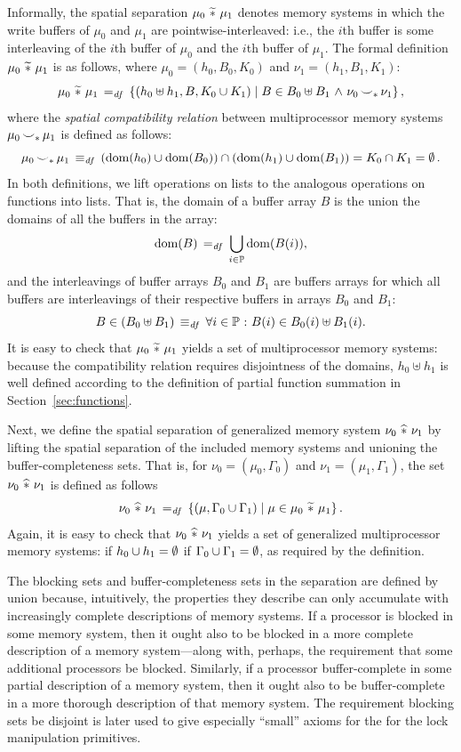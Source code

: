 \documentclass[11pt]{report}
\begin{document}
Informally, the spatial separation $\mu_0 \operatorname{\,\widetilde{\ast}\,} \mu_1$ denotes memory systems in which the write buffers of $\mu_0$ and $\mu_1$ are pointwise-interleaved: i.e., the $i$th buffer is some interleaving of the $i$th buffer of $\mu_0$ and the $i$th buffer of $\mu_1$. The formal definition $\mu_0 \operatorname{\,\widetilde{\ast}\,} \mu_1$ is as follows, where $\mu_0 = (h_0,B_0,K_0)$ and $\nu_1 = (h_1,B_1,K_1)$: \[ \mu_0 \operatorname{\,\widetilde{\ast}\,} \mu_1 \operatorname{\;=_{\mathit{df}}\;} \left\lbrace (h_0 \uplus h_1, B, K_0 \cup K_1) \mid B \in B_0 \uplus B_1 \operatorname{\,\wedge\,} \nu_0 \operatorname{\smile}_\ast \nu_1 \right\rbrace,\] where the \emph{spatial compatibility relation} between multiprocessor memory systems $\mu_0 \operatorname{\smile}_\ast \mu_1$ is defined as follows: \[ \mu_0 \operatorname{\smile}_\ast \mu_1 \operatorname{\;\equiv_{\mathit{df}}\;} \left(\operatorname{\mathrm{dom}}(h_0) \cup \operatorname{\mathrm{dom}}(B_0) \right) \cap \left( \operatorname{\mathrm{dom}}(h_1) \cup \operatorname{\mathrm{dom}}(B_1) \right) = K_0 \cap K_1 = \operatorname{\emptyset}.\] In both definitions, we lift operations on lists to the analogous operations on functions into lists. That is, the domain of a buffer array $B$ is the union the domains of all the buffers in the array:  \[ \operatorname{\mathrm{dom}}(B) \operatorname{\;=_{\mathit{df}}\;} \bigcup_{i \in \mathbb{P}} \operatorname{\mathrm{dom}}(B(i)),\] and the interleavings of buffer arrays $B_0$ and $B_1$ are buffers arrays for which all buffers are interleavings of their respective buffers in arrays $B_0$ and $B_1$: \[ B \in (B_0 \uplus B_1) \operatorname{\;\equiv_{\mathit{df}}\;} \forall i \in \mathbb{P} \operatorname{\,:\,} B(i) \in B_0(i) \uplus B_1(i).\] It is easy to check that $\mu_0 \operatorname{\,\widetilde{\ast}\,} \mu_1$ yields a set of multiprocessor memory systems: because the compatibility relation requires disjointness of the domains, $h_0 \uplus h_1$ is well defined according to the definition of partial function summation in Section~\ref{sec:functions}. 

Next, we define the spatial separation of generalized memory system $\nu_0 \operatorname{\,\widehat{\ast}\,} \nu_1$ by lifting the spatial separation of the included memory systems and unioning the buffer-completeness sets. That is, for $\nu_0 = (\mu_0,\Gamma_0)$ and $\nu_1 = (\mu_1,\Gamma_1)$, the set $\nu_0 \operatorname{\,\widehat{\ast}\,} \nu_1$ is defined as follows \[ \nu_0 \operatorname{\,\widehat{\ast}\,} \nu_1 \operatorname{\;=_{\mathit{df}}\;} \left\lbrace (\mu,\Gamma_0 \cup \Gamma_1) \mid \mu \in \mu_0 \operatorname{\,\widetilde{\ast}\,} \mu_1 \right\rbrace.\] Again, it is easy to check that $\nu_0 \operatorname{\,\widehat{\ast}\,} \nu_1$ yields a set of generalized multiprocessor memory systems: if $h_0 \cup h_1 = \operatorname{\emptyset}$ if $\Gamma_0 \cup \Gamma_1 = \operatorname{\emptyset}$, as required by the definition. 

The blocking sets and buffer-completeness sets in the separation are defined by union because, intuitively, the properties they describe can only accumulate with increasingly complete descriptions of memory systems. If a processor is blocked in some memory system, then it ought also to be blocked in a more complete description of a memory system---along with, perhaps, the requirement that some additional processors be blocked. Similarly, if a processor buffer-complete in some partial description of a memory system, then it ought also to be buffer-complete in a more thorough description of that memory system. The requirement blocking sets be disjoint is later used to give especially ``small'' axioms for the for the lock manipulation primitives. 
\end{document}
